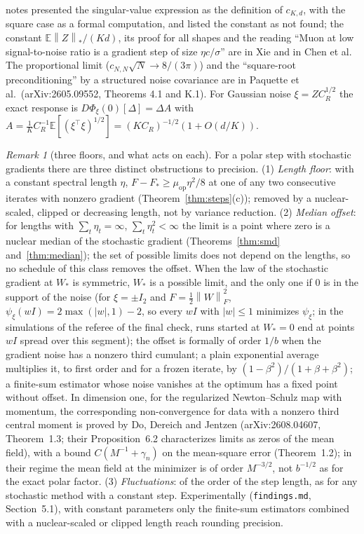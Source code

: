 \documentclass[11pt]{article}
\theoremstyle{definition}
\theoremstyle{remark}
\newtheorem{remark}[theorem]{Remark}
\newcommand{\E}{\mathbb{E}}
\newcommand{\nnuc}[1]{\left\|#1\right\|_{*}}
\newcommand{\nF}[1]{\left\|#1\right\|_{F}}
\newcommand{\abs}[1]{\left|#1\right|}
\newcommand{\muop}{\mu_{\mathrm{op}}}
\begin{document}
notes presented the singular-value expression as the definition of $c_{K,d}$, with the square case as a formal
computation, and listed the constant as not found; the constant $\E\nnuc Z/(Kd)$, its proof for all shapes and the
reading ``Muon at low signal-to-noise ratio is a gradient step of size $\eta c/\sigma$'' are in Xie and in Chen et al.
The proportional limit ($c_{N,N}\sqrt N\to8/(3\pi)$) and the ``square-root preconditioning'' by a structured noise
covariance are in Paquette et al.\ (arXiv:2605.09552, Theorems 4.1 and K.1). For Gaussian noise $\xi=ZC_R^{1/2}$ the
exact response is $D\Phi_\xi(0)[\Delta]=\Delta A$ with $A=\frac1KC_R^{-1}\E[(\xi^\top\xi)^{1/2}]=(KC_R)^{-1/2}(1+O(d/K))$.

\begin{remark}[three floors, and what acts on each]\label{rem:floors}
For a polar step with stochastic gradients there are three distinct obstructions to precision.
(1) \emph{Length floor}: with a constant spectral length $\eta$, $F-F_\ast\ge\muop\eta^2/8$ at one of any two consecutive
iterates with nonzero gradient (Theorem~\ref{thm:steps}(c)); removed by a nuclear-scaled, clipped or decreasing length,
not by variance reduction.
(2) \emph{Median offset}: for lengths with $\sum_t\eta_t=\infty$, $\sum_t\eta_t^2<\infty$ the limit is a point where
zero is a nuclear median of the stochastic gradient (Theorems~\ref{thm:smd} and~\ref{thm:median}); the set of possible
limits does not depend on the lengths, so no schedule of this class removes the offset. When the law of the stochastic
gradient at $W_\ast$ is symmetric, $W_\ast$ is a possible limit, and the only one if $0$ is in the support of the noise
(for $\xi=\pm I_2$ and $F=\frac12\nF W^2$, $\psi_\xi(wI)=2\max(\abs w,1)-2$, so every $wI$ with $\abs w\le1$ minimizes
$\psi_\xi$; in the simulations of the referee of the final check, runs started at $W_\ast=0$ end at points $wI$ spread
over this segment); the offset is formally of order $1/b$ when the gradient noise
has a nonzero third cumulant; a plain exponential average multiplies it, to first order and for a frozen iterate, by
$(1-\beta^2)/(1+\beta+\beta^2)$; a finite-sum estimator whose noise vanishes at the optimum has a fixed point without
offset. In dimension one, for the regularized Newton--Schulz map with momentum, the corresponding non-convergence for
data with a nonzero third central moment is proved by Do, Dereich and Jentzen (arXiv:2608.04607, Theorem~1.3; their
Proposition~6.2 characterizes limits as zeros of the mean field), with a bound $C(M^{-1}+\gamma_n)$ on the mean-square
error (Theorem~1.2); in their regime the mean field at the minimizer is of order $M^{-3/2}$, not $b^{-1/2}$ as for the
exact polar factor.
(3) \emph{Fluctuations}: of the order of the step length, as for any stochastic method with a constant step.
Experimentally (\texttt{findings.md}, Section~5.1), with constant parameters only the finite-sum estimators combined
with a nuclear-scaled or clipped length reach rounding precision.
\end{remark}
\end{document}
